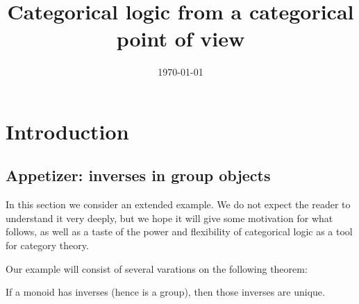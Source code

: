 \documentclass{book}
\title{Categorical logic from a categorical point of view}
\author{}
\date{\today}
\begin{document}
\maketitle
\setcounter{tocdepth}{1}
\tableofcontents

\setcounter{chapter}{-1}
\chapter{Introduction}
\label{chap:intro}


\section{Appetizer: inverses in group objects}
\label{sec:intro}

In this section we consider an extended example.
We do not expect the reader to understand it very deeply, but we hope it will give some motivation for what follows, as well as a taste of the power and flexibility of categorical logic as a tool for category theory.

Our example will consist of several varations on the following theorem:

\begin{thm}
  If a monoid has inverses (hence is a group), then those inverses are unique.
\end{thm}
\end{document}
